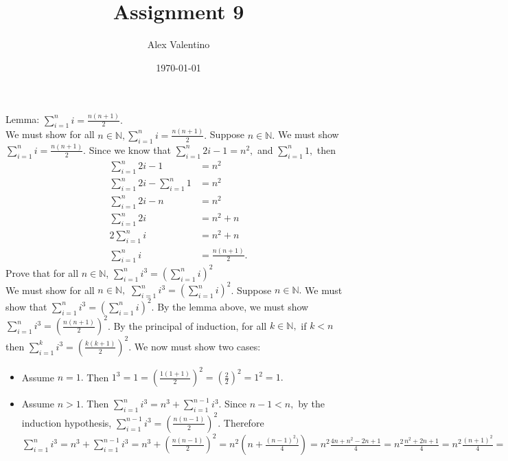 \documentclass[12pt, letterpaper]{article}
\date{\today}
\author{Alex Valentino}
\title{Assignment 9}
\newcommand{\N}{\mathbb{N}}
\begin{document}
	Lemma: $\sum_{i=1}^n i = \frac{n(n+1)}{2}.$\\
	We must show for all $n \in \N, \sum_{i=1}^n i = \frac{n(n+1)}{2}.$  Suppose $n\in \N.$ We must show $\sum_{i=1}^n i = \frac{n(n+1)}{2}.$  Since we know that $\sum_{i=1}^n 2i-1= n^2,$ and $\sum_{i=1}^n 1,$ then \begin{align*}
		\sum_{i=1}^n 2i-1 &= n^2\\
		\sum_{i=1}^n 2i - \sum_{i=1}^n 1  &= n^2\\
		\sum_{i=1}^n 2i - n &= n^2\\
		\sum_{i=1}^n 2i&= n^2 + n\\
		2\sum_{i=1}^n i&= n^2 + n\\
		\sum_{i=1}^n i&= \frac{n(n+1)}{2}.
	\end{align*}
	Prove that for all $n \in \N$, $\sum_{i=1}^n i^3 = (\sum_{i=1}^n i)^2$\\
	We must show for all $n \in \N,$ $\sum_{i=1}^n i^3 = (\sum_{i=1}^n i)^2$.  Suppose $n \in \N.$  We must show that $\sum_{i=1}^n i^3 = (\sum_{i=1}^n i)^2$.  By the lemma above, we must show $\sum_{i=1}^n i^3 = (\frac{n(n+1)}{2})^2$.  By the principal of induction, for all $k\in \N,$ if $k < n$ then $\sum_{i=1}^k i^3 = (\frac{k(k+1)}{2})^2$.  We now must show two cases:
	\begin{itemize}
		\item Assume $n=1.$  Then $1^3 = 1 = (\frac{1(1+1)}{2})^2=(\frac{2}{2})^2= 1^2 = 1.$
		\item Assume $n>1.$ Then $\sum_{i=1}^{n} i^3 = n^3 + \sum_{i=1}^{n-1} i^3$.  Since $n-1 < n,$ by the induction hypothesis, $\sum_{i=1}^{n-1} i^3 = (\frac{n(n-1)}{2})^2$.  Therefore $\sum_{i=1}^{n} i^3 = n^3 + \sum_{i=1}^{n-1} i^3 = n^3 + (\frac{n(n-1)}{2})^2 = n^2(n+\frac{(n-1)^2)}{4}) = n^2\frac{4n+n^2-2n+1}{4} = n^2\frac{n^2+2n+1}{4} =  n^2\frac{(n+1)^2}{4} = (\frac{n(n+1)}{2})^2.$
	\end{itemize}
\end{document}
